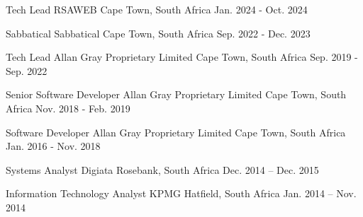   \begin{cventries}
    \cventry{}{}{}{}{}


    \cventry
      {Tech Lead}
      {RSAWEB}
      {Cape Town, South Africa}
      {Jan. 2024 - Oct. 2024}
      {}

    \cventry
      {Sabbatical}
      {Sabbatical}
      {Cape Town, South Africa}
      {Sep. 2022 - Dec. 2023}
      {}

    \cventry
      {Tech Lead}
      {Allan Gray Proprietary Limited}
      {Cape Town, South Africa}
      {Sep. 2019 - Sep. 2022}
      {}

    \cventry
      {Senior Software Developer}
      {Allan Gray Proprietary Limited}
      {Cape Town, South Africa}
      {Nov. 2018 - Feb. 2019}
      {}

    \cventry
      {Software Developer}
      {Allan Gray Proprietary Limited}
      {Cape Town, South Africa}
      {Jan. 2016 - Nov. 2018}
      {}

    \cventry
      {Systems Analyst}
      {Digiata}
      {Rosebank, South Africa}
      {Dec. 2014 – Dec. 2015}
      {}

    \cventry
      {Information Technology Analyst}
      {KPMG}
      {Hatfield, South Africa}
      {Jan. 2014 – Nov. 2014}
      {}
  \end{cventries}
